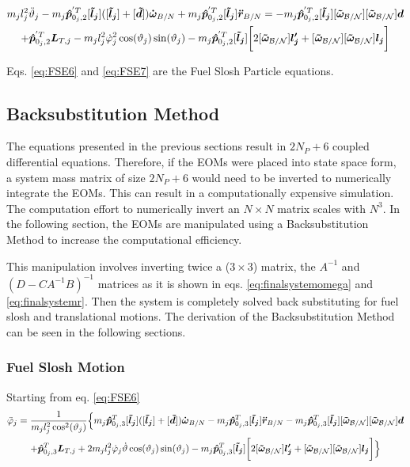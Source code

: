 \begin{multline}
	m_j l_j^2\ddot{\vartheta}_j - m_{j}\bm{\hat{p}}_{0_j,2}^{'T} [\bm{\tilde{l}_j}]( [\bm{\tilde{l}_j}] + [\bm{\tilde{d}}])\bm{\dot{\omega}}_{B/N}
	+m_{j} \bm{\hat{p}}_{0_j,2}^{'T} [\bm{\tilde{l}_j}] \bm{\ddot{r}}_{B/N}
	=-m_{j} \bm{\hat{p}}_{0_j,2}^{'T}[\bm{\tilde{l}_j}][\bm{\tilde{\omega}}_{\cal B/N}][\bm{\tilde{\omega}}_{\cal B/N}] \bm{d}\\+\bm{\hat{p}}_{0_j,2}^{'T} \bm{L}_{T,j}-m_j l_j^2\dot{\varphi}_j^2\cos(\vartheta_j)\sin(\vartheta_j)- m_j \bm{\hat{p}}_{0_j,2}^{'T} [\bm{\tilde{l}_j}]\bigg[2[\bm{\tilde{\omega}}_{\cal B/N}] \bm{l_j'}+[\bm{\tilde{\omega}}_{\cal B/N}][\bm{\tilde{\omega}}_{\cal B/N}] \bm{l_j}\bigg]
	\label{eq:FSE7}
\end{multline}

Eqs. \eqref{eq:FSE6} and \eqref{eq:FSE7} are the Fuel Slosh Particle equations.


\subsection{Backsubstitution Method}

The equations presented in the previous sections result in $2N_P + 6$ coupled differential equations. Therefore, if the EOMs were placed into state space form, a system mass matrix of size $2N_P + 6$ would need to be inverted to numerically integrate the EOMs. This can result in a computationally expensive simulation. The computation effort to numerically invert an $N\times N$ matrix scales with $N^{3}$. In the following section, the EOMs are manipulated using a Backsubstitution Method to increase the computational efficiency.

This manipulation involves inverting twice a ($3\times 3$) matrix, the $A^{-1}$ and $(D-CA^{-1}B)^{-1}$ matrices as it is shown in eqs. \eqref{eq:finalsystemomega}  and \eqref{eq:finalsystemr}. Then the system is completely solved back substituting for fuel slosh and translational motions. The derivation of the Backsubstitution Method can be seen in the following sections.
\\

\subsubsection{Fuel Slosh Motion}
Starting from eq. \eqref{eq:FSE6}
\begin{multline}
	\ddot{\varphi}_j  =\frac{1}{m_j l_j^2 \cos^2(\vartheta_j)}\Big\{m_{j}\bm{\hat{p}}_{0_j,3}^T [\bm{\tilde{l}_j}]( [\bm{\tilde{l}_j}]+[\bm{\tilde{d}}]) \bm{\dot{\omega}}_{B/N} -m_{j} \bm{\hat{p}}_{0_j,3}^{T} [\bm{\tilde{l}_j}] \bm{\ddot{r}}_{B/N} -m_{j} \bm{\hat{p}}_{0_j,3}^{T} [\bm{\tilde{l}_j}][\bm{\tilde{\omega}}_{\cal B/N}][\bm{\tilde{\omega}}_{\cal B/N}] \bm{d}\\+\bm{\hat{p}}_{0_j,3}^T \bm{L}_{T,j}+2m_j l_j^2\dot{\varphi}_j\dot{\vartheta}\cos(\vartheta_j)\sin(\vartheta_j)- m_j \bm{\hat{p}}_{0_j,3}^T [\bm{\tilde{l}_j}]\bigg[2[\bm{\tilde{\omega}}_{\cal B/N}] \bm{l_j'}+[\bm{\tilde{\omega}}_{\cal B/N}][\bm{\tilde{\omega}}_{\cal B/N}] \bm{l_j}\bigg]\Big\}
	\label{eq:BSM1}
\end{multline}

